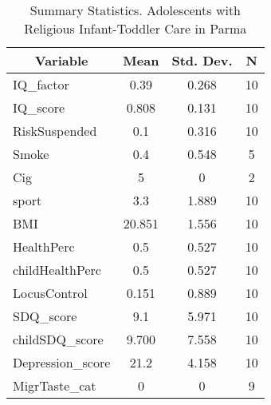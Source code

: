 
\begin{table}[htbp]\centering \caption{Summary Statistics. Adolescents with Religious Infant-Toddler Care in Parma \label{bothAdolasiloReliParma}}
\begin{tabular}{l c c  c}\hline\hline
\multicolumn{1}{c}{\textbf{Variable}} & \textbf{Mean}
 & \textbf{Std. Dev.} & \textbf{N}\\ \hline
IQ\_factor & 0.39 & 0.268  & 10\\
IQ\_score & 0.808 & 0.131  & 10\\
RiskSuspended & 0.1 & 0.316  & 10\\
Smoke & 0.4 & 0.548  & 5\\
Cig & 5 & 0  & 2\\
sport & 3.3 & 1.889  & 10\\
BMI & 20.851 & 1.556  & 10\\
HealthPerc & 0.5 & 0.527  & 10\\
childHealthPerc & 0.5 & 0.527  & 10\\
LocusControl & 0.151 & 0.889  & 10\\
SDQ\_score & 9.1 & 5.971  & 10\\
childSDQ\_score & 9.700 & 7.558  & 10\\
Depression\_score & 21.2 & 4.158  & 10\\
MigrTaste\_cat & 0 & 0  & 9\\
\hline\end{tabular}
\end{table}
